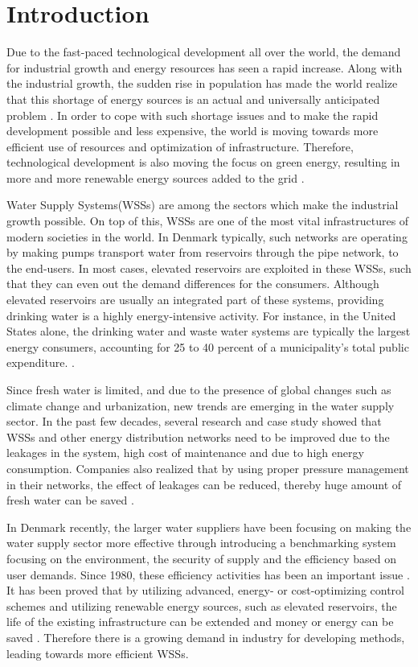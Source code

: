 \chapter{Introduction}
\label{introduction}

Due to the fast-paced technological development all over the world, the demand for industrial growth and energy resources has seen a rapid increase. Along with the industrial growth, the sudden rise in population has made the world realize that this shortage of energy sources is an actual and universally anticipated problem \cite{sustainable_water}. In order to cope with such shortage issues and to make the rapid development possible and less expensive, the world is moving towards more efficient use of resources and optimization of infrastructure. Therefore, technological development is also moving the focus on green energy, resulting in more and more renewable energy sources added to the grid \cite{fluctuating_price}. 

Water Supply Systems(WSSs) are among the sectors which make the industrial growth possible. On top of this, WSSs are one of the most vital infrastructures of modern societies in the world. In Denmark typically, such networks are operating by making pumps transport water from reservoirs through the pipe network, to the end-users. In most cases, elevated reservoirs are exploited in these WSSs, such that they can even out the demand differences for the consumers. Although elevated reservoirs are usually an integrated part of these systems, providing drinking water is a highly energy-intensive activity. For instance, in the United States alone, the drinking water and waste water systems are typically the largest energy consumers, accounting for 25 to 40 percent of a municipality's total public expenditure. \cite{appelbaum2002water}. 

Since fresh water is limited, and due to the presence of global changes such as climate change and urbanization, new trends are emerging in the water supply sector. In the past few decades, several research and case study showed that WSSs and other energy distribution networks need to be improved due to the leakages in the system, high cost of maintenance and due to high energy consumption. Companies also realized that by using proper pressure management in their networks, the effect of leakages can be reduced, thereby huge amount of fresh water can be saved \cite{national2005public}. 

In Denmark recently, the larger water suppliers have been focusing on making the water supply sector more effective through introducing a benchmarking system focusing on the environment, the security of supply and the efficiency based on user demands. Since 1980, these efficiency activities has been an important issue \cite{water_denmark}. It has been proved that by utilizing advanced, energy- or cost-optimizing control schemes and utilizing renewable energy sources, such as elevated reservoirs, the life of the existing infrastructure can be extended and money or energy can be saved \cite{sustainable_water}. Therefore there is a growing demand in industry for developing methods, leading towards more efficient WSSs. 

